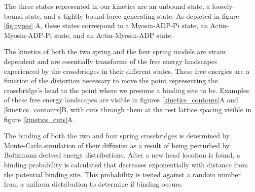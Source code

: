 \documentclass[]{article}
\begin{document}
The three states represented in our kinetics are an unbound state, a loosely-bound state, and a tightly-bound force-generating state.
As depicted in figure \ref{fig:types} A, these states correspond to a Myosin-ADP-Pi state, an Actin-Myosin-ADP-Pi state, and an Actin-Myosin-ADP state.

The kinetics of both the two spring and the four spring models are strain dependent and are essentially transforms of the free energy landscapes experienced by the crossbridges in their different states.
These free energies are a function of the distortion necessary to move the point representing the crossbridge's head to the point where we presume a binding site to be.
Examples of these free energy landscapes are visible in figures \ref{kinetics_contours}A and \ref{kinetics_contours}B, with cuts through them at the rest lattice spacing visible in figure \ref{kinetics_cuts}A.

The binding of both the two and four spring crossbridges is determined by Monte-Carlo simulation of their diffusion as a result of being perturbed by Boltzmann derived energy distributions. 
After a new head location is found, a binding probability is calculated that decreases exponentially with distance from the potential binding site. 
This probability is tested against a random number from a uniform distribution to determine if binding occurs.
\end{document}
